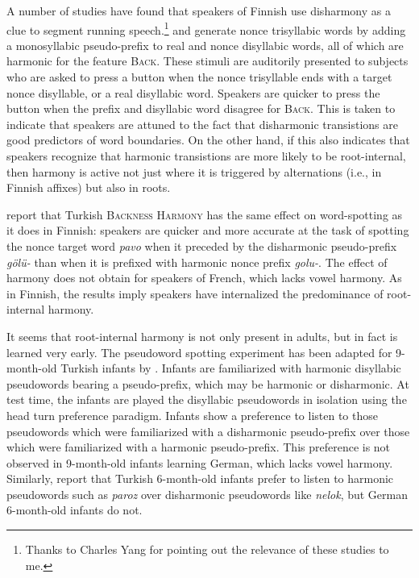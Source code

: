 A number of studies have found that speakers of Finnish use disharmony as a clue to segment running speech.\footnote{Thanks to Charles Yang for pointing out the relevance of these studies to me.} \citet{Suomi1997} and \citet{Vroomen1998} generate nonce trisyllabic words by adding a monosyllabic pseudo-prefix to real and nonce disyllabic words, all of which are harmonic for the feature \textsc{Back}. These stimuli are auditorily presented to subjects who are asked to press a button when the nonce trisyllable ends with a target nonce disyllable, or a real disyllabic word. Speakers are quicker to press the button when the prefix and disyllabic word disagree for \textsc{Back}. This is taken to indicate that speakers are attuned to the fact that disharmonic transistions are good predictors of word boundaries. On the other hand, if this also indicates that speakers recognize that harmonic transistions are more likely to be root-internal, then harmony is active not just where it is triggered by alternations (i.e., in Finnish affixes) but also in roots. 

\citet{Kabak2010} report that Turkish \textsc{Backness Harmony} has the same effect on word-spotting as it does in Finnish: speakers are quicker and more accurate at the task of spotting the nonce target word \emph{pavo} when it preceded by the disharmonic pseudo-prefix \emph{gölü-} than when it is prefixed with harmonic nonce prefix \emph{golu-}. The effect of harmony does not obtain for speakers of French, which lacks vowel harmony. As in Finnish, the results imply speakers have internalized the predominance of root-internal harmony.

It seems that root-internal harmony is not only present in adults, but in fact is learned very early. The pseudoword spotting experiment has been adapted for 9-month-old Turkish infants by \citet{Kampen2008}. Infants are familiarized with harmonic disyllabic pseudowords bearing a pseudo-prefix, which may be harmonic or disharmonic. At test time, the infants are played the disyllabic pseudowords in isolation using the head turn preference paradigm. Infants show a preference to listen to those pseudowords which were familiarized with a disharmonic pseudo-prefix over those which were familiarized with a harmonic pseudo-prefix. This preference is not observed in 9-month-old infants learning German, which lacks vowel harmony. Similarly, \citeauthor{Kampen2008} report that Turkish 6-month-old infants prefer to listen to harmonic pseudowords such as \emph{paroz} over disharmonic pseudowords like \emph{nelok}, but German 6-month-old infants do not.

